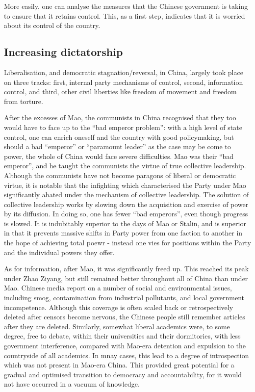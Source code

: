 \documentclass[10pt,a4paper,twocolumn]{article}
\newcounter{count}
\begin{document}
More easily, one can analyse the measures that the Chinese government is taking to ensure that it retains control. This, as a first step, indicates that it is worried about its control of the country.

\subsection{Increasing dictatorship}

Liberalisation, and democratic stagnation/reversal, in China, largely took place on three tracks: first, internal party mechanisms of control, second, information control, and third, other civil liberties like freedom of movement and freedom from torture.

After the excesses of Mao, the communists in China recognised that they too would have to face up to the ``bad emperor problem'': with a high level of state control, one can enrich oneself and the country with good policymaking, but should a bad ``emperor'' or ``paramount leader'' as the case may be come to power, the whole of China would face severe difficulties. Mao was their ``bad emperor'', and he taught the communists the virtue of true collective leadership. Although the communists have not become paragons of liberal or democratic virtue, it is notable that the infighting which characterised the Party under Mao significantly abated under the mechanism of collective leadership. The solution of collective leadership works by slowing down the acquisition and exercise of power by its diffusion. In doing so, one has fewer ``bad emperors'', even though progress is slowed. It is indubitably superior to the days of Mao or Stalin, and is superior in that it prevents massive shifts in Party power from one faction to another in the hope of achieving total poewr - instead one vies for positions within the Party and the individual powers they offer.

As for information, after Mao, it was significantly freed up. This reached its peak under Zhao Ziyang, but still remained better throughout all of China than under Mao. Chinese media report on a number of social and environmental issues, including smog, contamination from industrial pollutants, and local government incompetence. Although this coverage is often scaled back or retrospectively deleted after censors become nervous, the Chinese people still remember articles after they are deleted. Similarly, somewhat liberal academics were, to some degree, free to debate, within their universities and their dormitories, with less government interference, compared with Mao-era detention and expulsion to the countryside of all academics. In mnay cases, this lead to a degree of introspection which was not present in Mao-era China. This provided great potential for a gradual and optimised transition to democracy and accountability, for it would not have occurred in a vacuum of knowledge.
\end{document}

